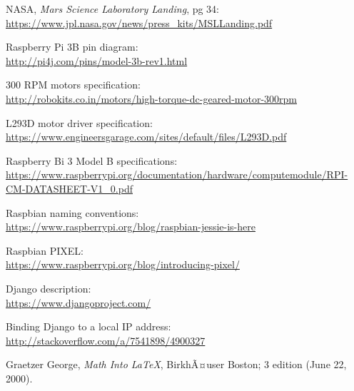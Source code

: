 \documentclass[a4paper, 12pt, onecolumn]{article}
\begin{document}
\begin{thebibliography}{10}	%
	
	 NASA, \textit{Mars Science Laboratory Landing}, pg 34: \\
	\url{https://www.jpl.nasa.gov/news/press_kits/MSLLanding.pdf}
	
	
	 Raspberry Pi 3B pin diagram: \\
	\url{http://pi4j.com/pins/model-3b-rev1.html}

	
	 300 RPM motors specification: \\
	\url{http://robokits.co.in/motors/high-torque-dc-geared-motor-300rpm}
	
	 L293D motor driver specification: \\
	\url{https://www.engineersgarage.com/sites/default/files/L293D.pdf}
	

	 Raspberry Bi 3 Model B specifications: \\
	\url{https://www.raspberrypi.org/documentation/hardware/computemodule/RPI-CM-DATASHEET-V1_0.pdf}
		
	
	 Raspbian naming conventions: \\
	\url{https://www.raspberrypi.org/blog/raspbian-jessie-is-here}
	
	 Raspbian PIXEL: \\
	\url{https://www.raspberrypi.org/blog/introducing-pixel/}
	
	 Django description: \\
	\url{https://www.djangoproject.com/}
	
	 Binding Django to a local IP address: \\
	\url{http://stackoverflow.com/a/7541898/4900327}
	
	
	 Graetzer George, \emph{Math Into \LaTeX},
	BirkhÃ¤user Boston; 3 edition (June 22, 2000).
	
\end{thebibliography}
\end{document}
